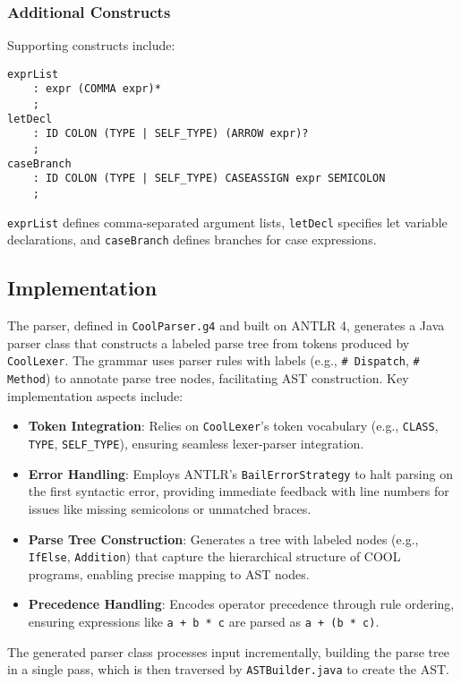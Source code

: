 \documentclass[11pt, titlepage]{article}
\begin{document}
\subsubsection{Additional Constructs}
Supporting constructs include:
\begin{lstlisting}
exprList
    : expr (COMMA expr)*
    ;
letDecl
    : ID COLON (TYPE | SELF_TYPE) (ARROW expr)?
    ;
caseBranch
    : ID COLON (TYPE | SELF_TYPE) CASEASSIGN expr SEMICOLON
    ;
\end{lstlisting}
\texttt{exprList} defines comma-separated argument lists, \texttt{letDecl} specifies let variable declarations, and \texttt{caseBranch} defines branches for case expressions.

\subsection{Implementation}
The parser, defined in \texttt{CoolParser.g4} and built on ANTLR 4, generates a Java parser class that constructs a labeled parse tree from tokens produced by \texttt{CoolLexer}. The grammar uses parser rules with labels (e.g., \texttt{\# Dispatch}, \texttt{\# Method}) to annotate parse tree nodes, facilitating AST construction. Key implementation aspects include:
\begin{itemize}[leftmargin=*]
    \item \textbf{Token Integration}: Relies on \texttt{CoolLexer}'s token vocabulary (e.g., \texttt{CLASS}, \texttt{TYPE}, \texttt{SELF\_TYPE}), ensuring seamless lexer-parser integration.
    \item \textbf{Error Handling}: Employs ANTLR's \texttt{BailErrorStrategy} to halt parsing on the first syntactic error, providing immediate feedback with line numbers for issues like missing semicolons or unmatched braces.
    \item \textbf{Parse Tree Construction}: Generates a tree with labeled nodes (e.g., \texttt{IfElse}, \texttt{Addition}) that capture the hierarchical structure of COOL programs, enabling precise mapping to AST nodes.
    \item \textbf{Precedence Handling}: Encodes operator precedence through rule ordering, ensuring expressions like \texttt{a + b * c} are parsed as \texttt{a + (b * c)}.
\end{itemize}
The generated parser class processes input incrementally, building the parse tree in a single pass, which is then traversed by \texttt{ASTBuilder.java} to create the AST.
\end{document}
